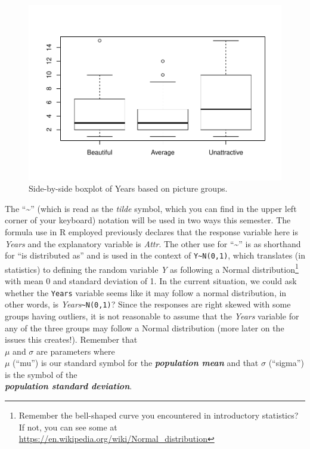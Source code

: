 \documentclass[]{book}
\let\rmarkdownfootnote\footnote%
\def\footnote{\protect\rmarkdownfootnote}
\begin{document}
\begin{figure}[htbp]
\centering
\includegraphics{GreenwoodBanner_files/figure-latex/Figure2-4-1.pdf}
\caption{\label{fig:Figure2-4}Side-by-side boxplot of Years based on picture groups.}
\end{figure}

The ``\textasciitilde{}'' (which is read as the \emph{tilde} symbol,
which you can find in the upper left corner of your keyboard) notation
will be used in two ways this semester. The formula use in R employed
previously declares that the response variable here is \emph{Years} and
the explanatory variable is \emph{Attr}. The other use for
``\textasciitilde{}'' is as shorthand for ``is distributed as'' and is
used in the context of \texttt{Y\textasciitilde{}N(0,1)}, which
translates (in statistics) to defining the random variable \emph{Y} as
following a Normal distribution\footnote{Remember the bell-shaped curve
  you encountered in introductory statistics? If not, you can see some
  at \url{https://en.wikipedia.org/wiki/Normal_distribution}} with mean
0 and standard deviation of 1. In the current situation, we could ask
whether the \texttt{Years} variable seems like it may follow a normal
distribution, in other words, is
\emph{Years}\texttt{\textasciitilde{}N(0,1)}? Since the responses are
right skewed with some groups having outliers, it is not reasonable to
assume that the \emph{Years} variable for any of the three groups may
follow a Normal distribution (more later on the issues this creates!).
Remember that\\
\(\mu\) and \(\sigma\) are parameters where\\
\(\mu\) (``mu'') is our standard symbol for the \textbf{\emph{population
mean}} and that \(\sigma\) (``sigma'') is the symbol of the\\
\textbf{\emph{population standard deviation}}.
\end{document}
